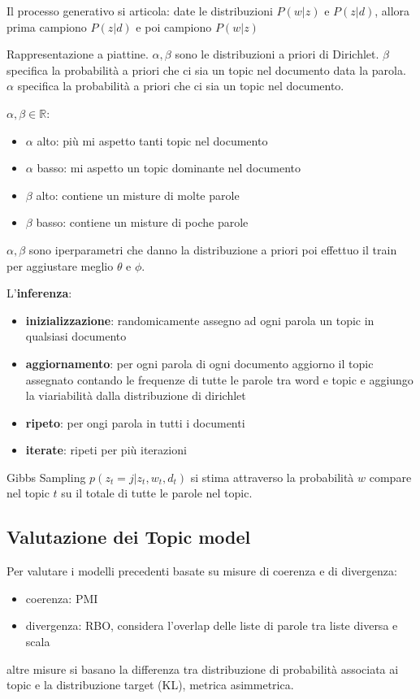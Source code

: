 Il processo generativo si articola: date le distribuzioni $P(w|z)$ e $P(z|d)$, allora prima campiono 
$P(z|d)$ e poi campiono $P(w|z)$

Rappresentazione a piattine.
$\alpha, \beta$ sono le distribuzioni a priori di Dirichlet. $\beta$ specifica la 
probabilità a priori che ci sia un topic nel documento data la parola.
$\alpha$ specifica la probabilità a priori che ci sia un topic nel documento.

$\alpha, \beta\in \mathbb{R}$:
\begin{itemize}
      \item $\alpha$ alto: più mi aspetto tanti topic nel documento
      \item $\alpha$ basso: mi aspetto un topic dominante nel documento
      \item $\beta$ alto: contiene un misture di molte parole
      \item $\beta$ basso: contiene un misture di poche parole
\end{itemize} 

$\alpha, \beta$ sono iperparametri che danno la distribuzione a priori poi effettuo 
il train per aggiustare meglio $\theta$ e $\phi$. 

L'\textbf{inferenza}:
\begin{itemize}
      \item \textbf{inizializzazione}: randomicamente assegno ad ogni parola un 
      topic in qualsiasi documento
      \item \textbf{aggiornamento}: per ogni parola di ogni documento aggiorno il 
      topic assegnato contando le frequenze di tutte le parole tra word e topic e 
      aggiungo la viariabilità dalla distribuzione di dirichlet
      \item \textbf{ripeto}: per ongi parola in tutti i documenti
      \item \textbf{iterate}: ripeti per più iterazioni
\end{itemize}

Gibbs Sampling $p(z_t = j | z_t, w_t,d_t)$ si stima attraverso la probabilità $w$ 
compare nel topic $t$ su il totale di tutte le parole nel topic. 

\subsection{Valutazione dei Topic model}
Per valutare i modelli precedenti basate su misure di coerenza e di divergenza:
\begin{itemize}
      \item coerenza: PMI
      \item divergenza: RBO, considera l'overlap delle liste di parole tra liste diversa e scala 
      
\end{itemize}

altre misure si basano la differenza tra distribuzione di probabilità associata ai 
topic e la distribuzione target (KL), metrica asimmetrica.

